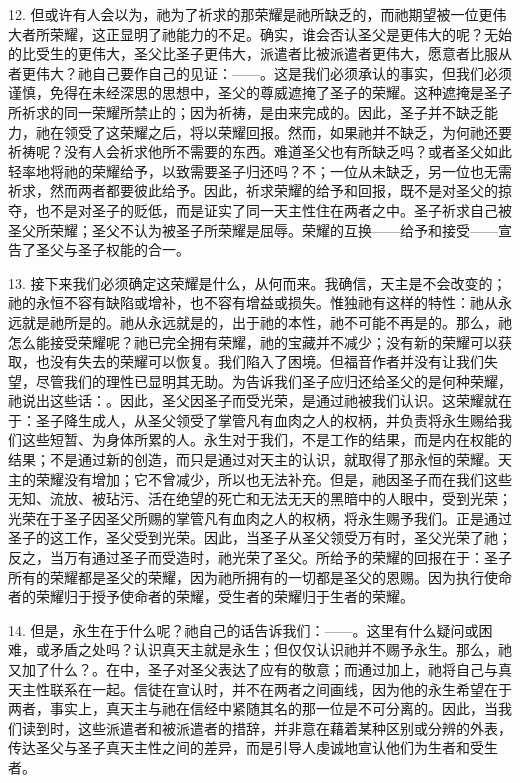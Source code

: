 12. 但或许有人会以为，祂为了祈求的那荣耀是祂所缺乏的，而祂期望被一位更伟大者所荣耀，这正显明了祂能力的不足。确实，谁会否认圣父是更伟大的呢？无始的比受生的更伟大，圣父比圣子更伟大，派遣者比被派遣者更伟大，愿意者比服从者更伟大？祂自己要作自己的见证：——。这是我们必须承认的事实，但我们必须谨慎，免得在未经深思的思想中，圣父的尊威遮掩了圣子的荣耀。这种遮掩是圣子所祈求的同一荣耀所禁止的；因为祈祷，是由来完成的。因此，圣子并不缺乏能力，祂在领受了这荣耀之后，将以荣耀回报。然而，如果祂并不缺乏，为何祂还要祈祷呢？没有人会祈求他所不需要的东西。难道圣父也有所缺乏吗？或者圣父如此轻率地将祂的荣耀给予，以致需要圣子归还吗？不；一位从未缺乏，另一位也无需祈求，然而两者都要彼此给予。因此，祈求荣耀的给予和回报，既不是对圣父的掠夺，也不是对圣子的贬低，而是证实了同一天主性住在两者之中。圣子祈求自己被圣父所荣耀；圣父不认为被圣子所荣耀是屈辱。荣耀的互换——给予和接受——宣告了圣父与圣子权能的合一。\par

13. 接下来我们必须确定这荣耀是什么，从何而来。我确信，天主是不会改变的；祂的永恒不容有缺陷或增补，也不容有增益或损失。惟独祂有这样的特性：祂从永远就是祂所是的。祂从永远就是的，出于祂的本性，祂不可能不再是的。那么，祂怎么能接受荣耀呢？祂已完全拥有荣耀，祂的宝藏并不减少；没有新的荣耀可以获取，也没有失去的荣耀可以恢复。我们陷入了困境。但福音作者并没有让我们失望，尽管我们的理性已显明其无助。为告诉我们圣子应归还给圣父的是何种荣耀，祂说出这些话：。因此，圣父因圣子而受光荣，是通过祂被我们认识。这荣耀就在于：圣子降生成人，从圣父领受了掌管凡有血肉之人的权柄，并负责将永生赐给我们这些短暂、为身体所累的人。永生对于我们，不是工作的结果，而是内在权能的结果；不是通过新的创造，而只是通过对天主的认识，就取得了那永恒的荣耀。天主的荣耀没有增加；它不曾减少，所以也无法补充。但是，祂因圣子而在我们这些无知、流放、被玷污、活在绝望的死亡和无法无天的黑暗中的人眼中，受到光荣；光荣在于圣子因圣父所赐的掌管凡有血肉之人的权柄，将永生赐予我们。正是通过圣子的这工作，圣父受到光荣。因此，当圣子从圣父领受万有时，圣父光荣了祂；反之，当万有通过圣子而受造时，祂光荣了圣父。所给予的荣耀的回报在于：圣子所有的荣耀都是圣父的荣耀，因为祂所拥有的一切都是圣父的恩赐。因为执行使命者的荣耀归于授予使命者的荣耀，受生者的荣耀归于生者的荣耀。\par

14. 但是，永生在于什么呢？祂自己的话告诉我们：——。这里有什么疑问或困难，或矛盾之处吗？认识真天主就是永生；但仅仅认识祂并不赐予永生。那么，祂又加了什么？。在中，圣子对圣父表达了应有的敬意；而通过加上，祂将自己与真天主性联系在一起。信徒在宣认时，并不在两者之间画线，因为他的永生希望在于两者，事实上，真天主与祂在信经中紧随其名的那一位是不可分离的。因此，当我们读到时，这些派遣者和被派遣者的措辞，并非意在藉着某种区别或分辨的外表，传达圣父与圣子真天主性之间的差异，而是引导人虔诚地宣认他们为生者和受生者。\par

